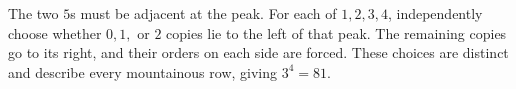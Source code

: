 The two $5$s must be adjacent at the peak. For each of $1,2,3,4$, independently choose whether $0,1,$ or $2$ copies lie to the left of that peak. The remaining copies go to its right, and their orders on each side are forced. These choices are distinct and describe every mountainous row, giving $\boxed{3^4=81}$.
